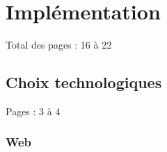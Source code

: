 \documentclass{EPL-master-thesis-covers-FR}
\begin{document}




	\chapter{Implémentation}

		Total des pages : 16 à 22


		\section{Choix technologiques}
			\label{sec:choix_tech}

			Pages : 3 à 4



			\subsection*{Web}
\end{document}
